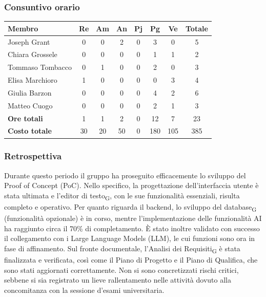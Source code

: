 \documentclass[11pt,a4paper]{article}
\newcommand{\gls}[1]{#1\textsubscript{G}}
\begin{document}
\subsubsection{Consuntivo orario}
\begin{center}
    \begin{tabular}{|l|c|c|c|c|c|c|c|}
        \hline
        \textbf{Membro} & \textbf{Re} & \textbf{Am} & \textbf{An} & \textbf{Pj} & \textbf{Pg} & \textbf{Ve} & \textbf{Totale} \\
        \hline
        Joseph Grant & 0 & 0 & 2 & 0 & 3 & 0 & 5 \\
        \hline
        Chiara Grossele & 0 & 0 & 0 & 0 & 1 & 1 & 2 \\
        \hline
        Tommaso Tombacco & 0 & 1 & 0 & 0 & 2 & 0 & 3 \\
        \hline
        Elisa Marchioro & 1 & 0 & 0 & 0 & 0 & 3 & 4 \\
        \hline
        Giulia Barzon & 0 & 0 & 0 & 0 & 4 & 2 & 6 \\
        \hline
        Matteo Cuogo & 0 & 0 & 0 & 0 & 2 & 1 & 3 \\
        \hline
        \textbf{Ore totali} & 1 & 1 & 2 & 0 & 12 & 7 & 23 \\
        \hline
        \textbf{Costo totale} & 30 & 20 & 50 & 0 & 180 & 105 & 385 \\
        \hline
    \end{tabular}
\end{center}

\subsubsection{Retrospettiva}
Durante questo periodo il gruppo ha proseguito efficacemente lo sviluppo del Proof of Concept (PoC). Nello specifico, la progettazione dell'interfaccia utente è stata ultimata e l'\gls{editor di testo}, con le sue funzionalità essenziali, risulta completo e operativo. Per quanto riguarda il backend, lo sviluppo del \gls{database} (funzionalità opzionale) è in corso, mentre l'implementazione delle funzionalità AI ha raggiunto circa il 70\% di completamento. È stato inoltre validato con successo il collegamento con i Large Language Models (LLM), le cui funzioni sono ora in fase di affinamento.
Sul fronte documentale, l'\gls{Analisi dei Requisiti} è stata finalizzata e verificata, così come il Piano di Progetto e il Piano di Qualifica, che sono stati aggiornati correttamente.
Non si sono concretizzati rischi critici, sebbene si sia registrato un lieve rallentamento nelle attività dovuto alla concomitanza con la sessione d'esami universitaria.
\end{document}
